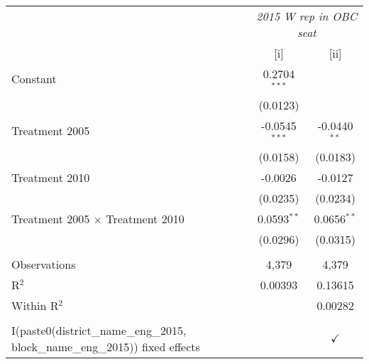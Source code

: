 
\begingroup
\centering
\begin{tabular}{lcc}
   \toprule
    & \multicolumn{2}{c}{\textit{2015 W rep in OBC seat}}\\
                                                                                    & [i]             & [ii]\\  
   \midrule 
   Constant                                                                         & 0.2704$^{***}$  &   \\   
                                                                                    & (0.0123)        &   \\   
   Treatment 2005                                                                   & -0.0545$^{***}$ & -0.0440$^{**}$\\   
                                                                                    & (0.0158)        & (0.0183)\\   
   Treatment 2010                                                                   & -0.0026         & -0.0127\\   
                                                                                    & (0.0235)        & (0.0234)\\   
   Treatment 2005 $\times$ Treatment 2010                                           & 0.0593$^{**}$   & 0.0656$^{**}$\\   
                                                                                    & (0.0296)        & (0.0315)\\   
    \\
   Observations                                                                     & 4,379           & 4,379\\  
   R$^2$                                                                            & 0.00393         & 0.13615\\  
   Within R$^2$                                                                     &                 & 0.00282\\  
    \\
   I(paste0(district\_name\_eng\_2015, block\_name\_eng\_2015)) fixed effects       &                 & $\checkmark$\\   
   \bottomrule
\end{tabular}
\par\endgroup


